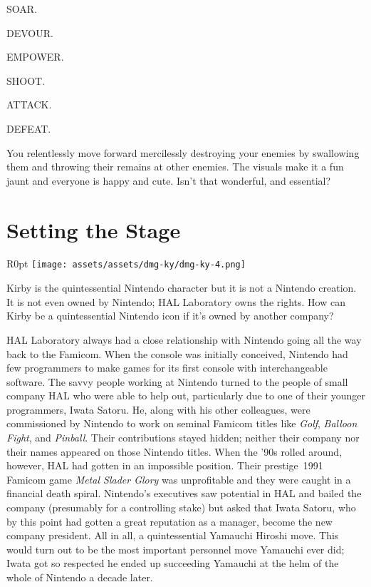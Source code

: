 \documentclass{book}
\begin{document}
SOAR.

DEVOUR.

EMPOWER.

SHOOT.

ATTACK.

DEFEAT.

You relentlessly move forward mercilessly destroying your enemies by swallowing them and throwing their remains at other enemies. The visuals make it a fun jaunt and everyone is happy and cute. Isn’t that wonderful, and essential?

\FloatBarrier\needspace{5pt}\section*{Setting the Stage}\nopagebreak[4]

\begin{wrapfigure}{R}{0pt} \texttt{[image: assets/assets/dmg-ky/dmg-ky-4.png]}\end{wrapfigure}
Kirby is the quintessential Nintendo character but it is not a Nintendo creation. It is not even owned by Nintendo; HAL Laboratory owns the rights. How can Kirby be a quintessential Nintendo icon if it’s owned by another company?

HAL Laboratory always had a close relationship with Nintendo going all the way back to the Famicom. When the console was initially conceived, Nintendo had few programmers to make games for its first console with interchangeable software. The savvy people working at Nintendo turned to the people of small company HAL who were able to help out, particularly due to one of their younger programmers, Iwata Satoru. He, along with his other colleagues, were commissioned by Nintendo to work on seminal Famicom titles like \emph{Golf}, \emph{Balloon Fight}, and \emph{Pinball}. Their contributions stayed hidden; neither their company nor their names appeared on those Nintendo titles. When the ’90s rolled around, however, HAL had gotten in an impossible position. Their prestige 1991 Famicom game \emph{Metal Slader Glory} was unprofitable and they were caught in a financial death spiral. Nintendo’s executives saw potential in HAL and bailed the company (presumably for a controlling stake) but asked that Iwata Satoru, who by this point had gotten a great reputation as a manager, become the new company president. All in all, a quintessential Yamauchi Hiroshi move. This would turn out to be the most important personnel move Yamauchi ever did; Iwata got so respected he ended up succeeding Yamauchi at the helm of the whole of Nintendo a decade later.
\end{document}
